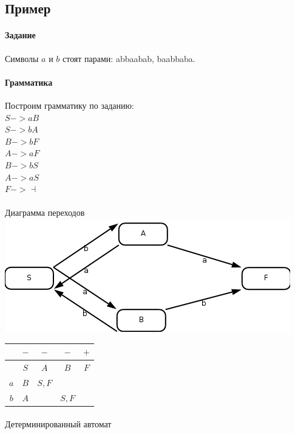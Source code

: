 \documentclass[a4paper,12pt]{article}
\begin{document}
\subsection{Пример}
\paragraph{Задание}
Символы $a$ и $b$ стоят парами: abbaabab, baabbaba.
\paragraph{Грамматика}
Построим грамматику по заданию: \\
$S -> aB$\\
$S -> bA$\\
$B -> bF$\\
$A -> aF$\\
$B -> bS$\\
$A -> aS$\\
$F -> \dashv$

\paragraph{}\vspace{1em}
Диаграмма переходов\\

\includegraphics[scale=0.5]{lab1/images/image1.jpg}\vspace{1em}

\begin{tabular}[l]{c|cccc}
    & $-$ & $-$   & $-$   & $+$ \\
\hline
    & $S$ & $A$   & $B$   & $F$ \\
$a$ & $B$ & $S,F$ &       &     \\
$b$ & $A$ &       & $S,F$ &     \\
\end{tabular}

\paragraph{}
Детерминированный автомат\\
\end{document}
